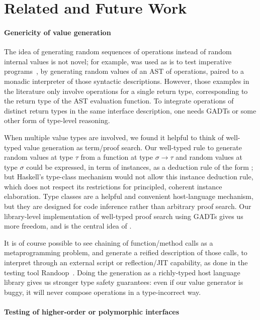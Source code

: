 \section{Related and Future Work}

\paragraph{Genericity of value generation}

The idea of generating random sequences of operations instead of
random internal values is not novel; for example, \qcheck was used as
is to test imperative programs~\cite{testing-monadic-code}, by
generating random values of an AST of operations, paired to a monadic
interpreter of those syntactic descriptions. However, those examples
in the literature only involve operations for a single return type,
corresponding to the return type of the AST evaluation function. To
integrate operations of distinct return types in the same interface
description, one needs GADTs or some other form of type-level
reasoning.

When multiple value types are involved, we found it helpful to think
of well-typed value generation as term/proof search. Our well-typed
rule to generate random values at type $\tau$ from a function at type
$\sigma \to \tau$ and random values at type $\sigma$ could be
expressed, in term of \qcheck {} instances, as
a deduction rule of the form ; but Haskell's type-class
mechanism would not allow this instance deduction rule, which does not
respect its restrictions for principled, coherent instance
elaboration. Type classes are a helpful and convenient host-language
mechanism, but they are designed for code inference rather than
arbitrary proof search. Our library-level implementation of well-typed
proof search using GADTs gives us more freedom, and is the central
idea of .

It is of course possible to see chaining of function/method calls as
a metaprogramming problem, and generate a reified description of those
calls, to interpret through an external script or reflection/JIT
capability, as done in the testing tool Randoop~\cite{randoop}. Doing
the generation as a richly-typed host language library gives us
stronger type safety guarantees: even if our value generator is buggy,
it will never compose operations in a type-incorrect way.

\paragraph{Testing of higher-order or polymorphic interfaces}

